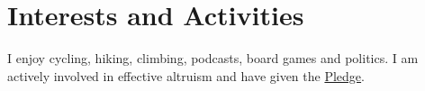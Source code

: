 \documentclass[a4paper,10pt]{article}
\begin{document}
\section{Interests and Activities}
I enjoy cycling, hiking, climbing, podcasts, board games and politics. I am actively involved in effective altruism and have given the \href{https://www.givingwhatwecan.org/}{Pledge}.
\end{document}
